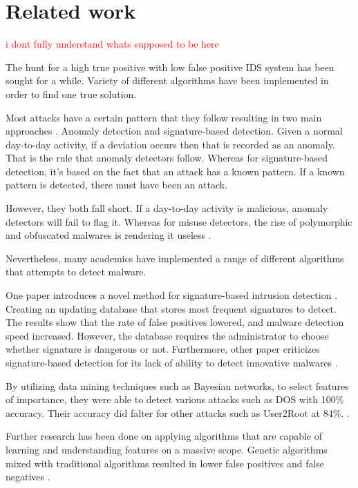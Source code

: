 \documentclass[11pt]{article}
\begin{document}
\newpage
\section{Related work}
\textcolor{red}{i dont fully understand whats supposed to be here}

The hunt for a high true positive with low false positive IDS system has been sought for a while. Variety of different algorithms have been implemented in order to find one true solution. 

Most attacks have a certain pattern that they follow resulting in two main approaches \cite{related-work-main-approaches}. Anomaly detection and signature-based detection. Given a normal day-to-day activity, if a deviation occurs then that is recorded as an anomaly. That is the rule that anomaly detectors follow. Whereas for signature-based detection, it’s based on the fact that an attack has a known pattern. If a known pattern is detected, there must have been an attack.

However, they both fall short. If a day-to-day activity is malicious, anomaly detectors will fail to flag it. Whereas for misuse detectors, the rise of polymorphic and obfuscated malwares is rendering it useless \cite{related-work-main-approaches}.

Nevertheless, many academics have implemented a range of different algorithms that attempts to detect malware. 

One paper introduces a novel method for signature-based intrusion detection \cite{related-work-signature-based}. Creating an updating database that stores most frequent signatures to detect. The results show that the rate of false positives lowered, and malware detection speed increased. However, the database requires the administrator to choose whether signature is dangerous or not. Furthermore, other paper criticizes signature-based detection for its lack of ability to detect innovative malwares \cite{related-work-criticise-signature}. 
 
By utilizing data mining techniques such as Bayesian networks, to select features of importance, they were able to detect various attacks such as DOS with 100\% accuracy. Their accuracy did falter for other attacks such as User2Root at 84\%. \cite{related-work-main-approaches}.

Further research has been done on applying algorithms that are capable of learning and understanding features on a massive scope. Genetic algorithms mixed with traditional algorithms resulted in lower false positives and false negatives \cite{related-work-criticise-signature}. 
\end{document}
